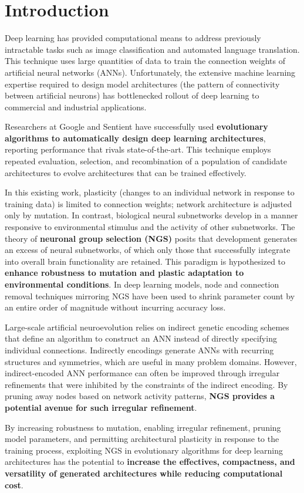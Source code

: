 \section{Introduction}

Deep learning has provided computational means to address previously intractable tasks such as image classification and automated language translation.
This technique uses large quantities of data to train the connection weights of artificial neural networks (ANNs).
Unfortunately, the extensive machine learning expertise required to design model architectures (the pattern of connectivity between artificial neurons) has bottlenecked rollout of deep learning to commercial and industrial applications.

Researchers at Google\autocite{real2017large} and Sentient\autocite{miikkulainen2017evolving} have successfully used \textbf{evolutionary algorithms to automatically design deep learning architectures}, reporting performance that rivals state-of-the-art.
This technique employs repeated evaluation, selection, and recombination of a population of candidate architectures to evolve architectures that can be trained effectively.%

In this existing work, plasticity (changes to an individual network in response to training data) is limited to connection weights;
network architecture is adjusted only by mutation.
In contrast, biological neural subnetworks develop in a manner responsive to environmental stimulus and the activity of other subnetworks.
The theory of \textbf{neuronal group selection (NGS)} posits that development generates an excess of neural subnetworks, of which only those that successfully integrate into overall brain functionality are retained.\autocite{sanes2011development}
This paradigm is hypothesized to \textbf{enhance robustness to mutation and plastic adaptation to environmental conditions}.\autocite{downing2015intelligence}
In deep learning models, node and connection removal techniques mirroring NGS have been used to shrink parameter count by an entire order of magnitude without incurring accuracy loss.\autocite{song2015learning}

Large-scale artificial neuroevolution relies on indirect genetic encoding schemes that define an algorithm to construct an ANN instead of directly specifying individual connections.
Indirectly encodings generate ANNs with recurring structures and symmetries, which are useful in many problem domains.
However, indirect-encoded ANN performance can often be improved through irregular refinements that were inhibited by the constraints of the indirect encoding.\autocite{clune2011performance}
By pruning away nodes based on network activity patterns, \textbf{NGS provides a potential avenue for such irregular refinement}.

By increasing robustness to mutation, enabling irregular refinement, pruning model parameters, and permitting architectural plasticity in response to the training process, exploiting NGS in evolutionary algorithms for deep learning architectures has the potential to \textbf{increase the effectives, compactness, and versatility of generated architectures while reducing computational cost}.

